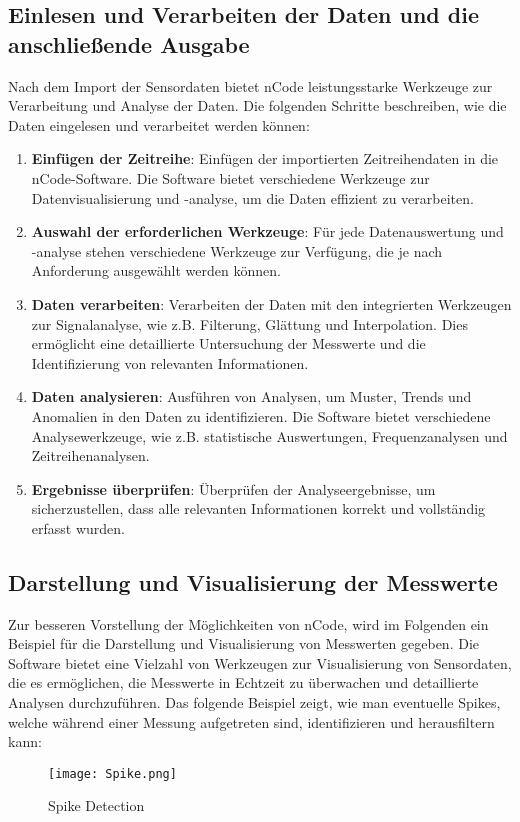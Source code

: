 \subsection{Einlesen und Verarbeiten der Daten und die anschließende Ausgabe}
Nach dem Import der Sensordaten bietet nCode leistungsstarke Werkzeuge zur Verarbeitung und Analyse der Daten. Die folgenden Schritte beschreiben, wie die Daten eingelesen und verarbeitet werden können:

\begin{enumerate}
    \item \textbf{Einfügen der Zeitreihe}: Einfügen der importierten Zeitreihendaten in die nCode-Software. Die Software bietet verschiedene Werkzeuge zur Datenvisualisierung und -analyse, um die Daten effizient zu verarbeiten.
    \item \textbf{Auswahl der erforderlichen Werkzeuge}: Für jede Datenauswertung und -analyse stehen verschiedene Werkzeuge zur Verfügung, die je nach Anforderung ausgewählt werden können.
    \item \textbf{Daten verarbeiten}: Verarbeiten der Daten mit den integrierten Werkzeugen zur Signalanalyse, wie z.B. Filterung, Glättung und Interpolation. Dies ermöglicht eine detaillierte Untersuchung der Messwerte und die Identifizierung von relevanten Informationen.
    \item \textbf{Daten analysieren}: Ausführen von Analysen, um Muster, Trends und Anomalien in den Daten zu identifizieren. Die Software bietet verschiedene Analysewerkzeuge, wie z.B. statistische Auswertungen, Frequenzanalysen und Zeitreihenanalysen.
    \item \textbf{Ergebnisse überprüfen}: Überprüfen der Analyseergebnisse, um sicherzustellen, dass alle relevanten Informationen korrekt und vollständig erfasst wurden.   
\end{enumerate}

\subsection{Darstellung und Visualisierung der Messwerte}
Zur besseren Vorstellung der Möglichkeiten von nCode, wird im Folgenden ein Beispiel für die Darstellung und Visualisierung von Messwerten gegeben. Die Software bietet eine Vielzahl von Werkzeugen zur Visualisierung von Sensordaten, die es ermöglichen, die Messwerte in Echtzeit zu überwachen und detaillierte Analysen durchzuführen. Das folgende Beispiel zeigt, wie man eventuelle Spikes, welche während einer Messung aufgetreten sind, identifizieren und herausfiltern kann:

\begin{figure}[htbp]
    \begin{center}
        \texttt{[image: Spike.png]}
        \caption[Spike Detection in nCode]{Spike Detection
        }
        \label{fig:Spike}
    \end{center}
\end{figure}